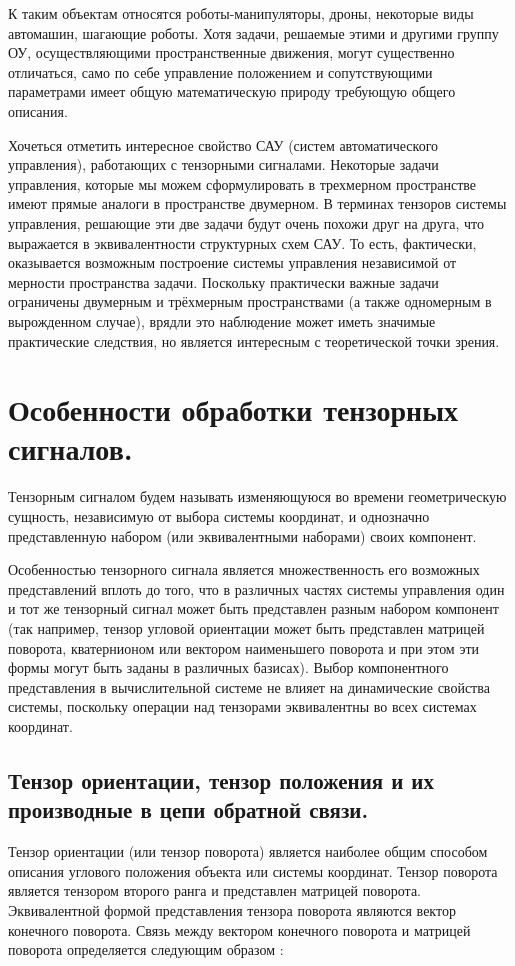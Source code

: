 \documentclass[a4paper]{article}
\begin{document}
К таким объектам относятся роботы-манипуляторы, дроны, некоторые виды автомашин, шагающие роботы. 
Хотя задачи, решаемые этими и другими группу ОУ, осуществляющими пространственные движения, могут существенно отличаться, само по себе управление положением и сопутствующими параметрами имеет общую математическую природу требующую общего описания.

Хочеться отметить интересное свойство САУ (систем автоматического управления), работающих с тензорными сигналами. Некоторые задачи управления, которые мы можем сформулировать в трехмерном пространстве имеют прямые аналоги в пространстве двумерном. В терминах тензоров системы управления, решающие эти две задачи будут очень похожи друг на друга, что выражается в эквивалентности структурных схем САУ. То есть, фактически, оказывается возможным построение системы управления независимой от мерности пространства задачи. Поскольку практически важные задачи ограничены двумерным и трёхмерным пространствами (а также одномерным в вырожденном случае), врядли это наблюдение может иметь значимые практические следствия, но является интересным с теоретической точки зрения. 

\section{Особенности обработки тензорных сигналов.}
Тензорным сигналом будем называть изменяющуюся во времени геометрическую сущность, независимую от выбора системы координат, и однозначно представленную набором (или эквивалентными наборами) своих компонент. 

Особенностью тензорного сигнала является множественность его возможных представлений вплоть до того, что в различных частях системы управления один и тот же тензорный сигнал может быть представлен разным набором компонент (так например, тензор угловой ориентации может быть представлен матрицей поворота, кватернионом или вектором наименьшего поворота и при этом эти формы могут быть заданы в различных базисах). Выбор компонентного представления в вычислительной системе не влияет на динамические свойства системы, поскольку операции над тензорами эквивалентны во всех системах координат.

\subsection{Тензор ориентации, тензор положения и их производные в цепи обратной связи. }
Тензор ориентации (или тензор поворота) является наиболее общим способом описания углового положения объекта или системы координат. Тензор поворота является тензором второго ранга и представлен матрицей поворота. Эквивалентной формой представления тензора поворота являются вектор конечного поворота. Связь между вектором конечного поворота и матрицей поворота определяется следующим образом \cite{zhilin}:
\end{document}
